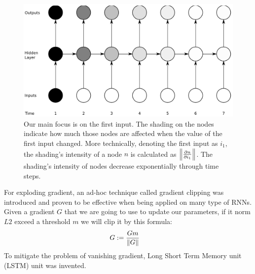 \begin{figure}[H]
	\centering
	\includegraphics[scale=0.37]{figure/gradient-vanish}
	\caption{Our main focus is on the first input. 
	The shading on the nodes indicate how much those nodes are affected when the value of the first input changed.
	More technically, denoting the first input as \(i_1\), the shading's intensity of a node \(n\) is calculated as \(\left\lVert \frac{\partial n}{\partial i_1} \right\rVert\). 
	The shading's intensity of nodes decrease exponentially through time steps.\cite{Graves-thesis}}
	\label{fig:gradient-vanish}
\end{figure}

For exploding gradient, an ad-hoc technique called gradient clipping\cite{gradient-clip} was introduced and proven to be effective when being applied on many type of RNNs. 
Given a gradient \(G\) that we are going to use to update our parameters, if it norm \(L2\) exceed a threshold \(m\) we will clip it by this formula:
\begin{align}
  	G &:= \frac{Gm}{\left\lVert G \right\rVert} &
\end{align}
To mitigate the problem of vanishing gradient, Long Short Term Memory unit (LSTM)\cite{originLSTM} unit was invented. 


